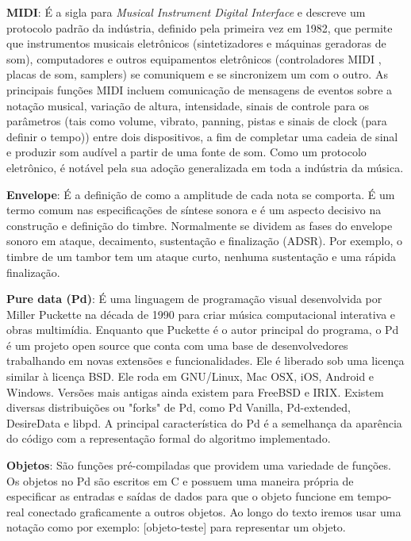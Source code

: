 \documentclass{ppgmus}
\begin{document}

\textbf{MIDI}: É a sigla para \textit{Musical Instrument Digital Interface} e descreve um protocolo padrão da indústria, 
definido pela primeira vez em 1982, que permite que instrumentos musicais eletrônicos 
(sintetizadores e máquinas geradoras de som), computadores e outros equipamentos eletrônicos (controladores MIDI , 
placas de som, samplers) se comuniquem e se sincronizem um com o outro. 
As principais funções MIDI incluem comunicação de mensagens de eventos sobre a notação musical,  variação de altura, 
intensidade, sinais de controle para os parâmetros (tais como volume, vibrato, panning, pistas e sinais de 
clock (para definir o tempo)) entre dois dispositivos, a fim de completar uma cadeia de sinal e produzir som 
audível a partir de uma fonte de som. Como um protocolo eletrônico, é notável pela sua adoção generalizada em 
toda a indústria da música.


\textbf{Envelope}: É a definição de como a amplitude de cada nota se comporta.
É um termo comum nas especificações de síntese sonora e é um aspecto decisivo na construção e 
definição do timbre. Normalmente se dividem as fases do
envelope sonoro em ataque, decaimento, sustentação e finalização (ADSR). Por
exemplo, o timbre de um tambor tem um ataque curto, nenhuma sustentação
e uma rápida finalização.

\textbf{Pure data (Pd)}: É uma linguagem de programação visual desenvolvida por Miller Puckette na década de 1990 
para criar música computacional interativa e obras multimídia. Enquanto que Puckette é o autor principal do programa, 
o Pd é um projeto open source que conta com uma base de desenvolvedores trabalhando em novas extensões e funcionalidades.
Ele é liberado sob uma licença similar à licença BSD. Ele roda em GNU/Linux, Mac OSX, iOS, Android e Windows. 
Versões mais antigas ainda existem para FreeBSD e IRIX. Existem diversas distribuições ou "forks" de Pd, como 
Pd Vanilla, Pd-extended, DesireData e libpd. A principal característica do Pd é a semelhança da aparência do código com
a representação formal do algoritmo implementado.


\textbf{Objetos}: São funções pré-compiladas que providem uma variedade de funções.
Os objetos no Pd são escritos em C e possuem uma maneira própria de especificar as entradas e saídas
de dados para que o objeto funcione em tempo-real conectado graficamente a outros objetos.
Ao longo do texto iremos usar uma notação como por exemplo: [objeto-teste] para
representar um objeto.
\end{document}
